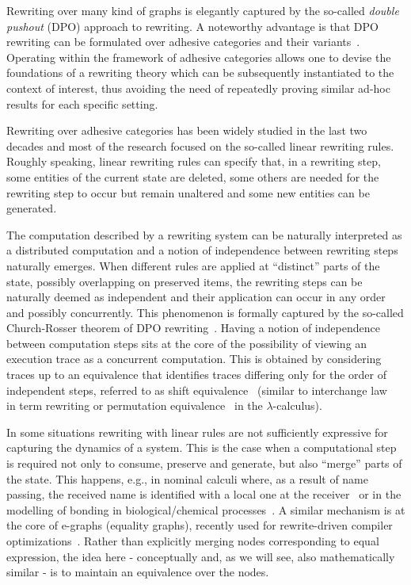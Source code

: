 \documentclass[a4paper,UKenglish,cleveref,pdftex, thm-restate,numberwithinsect]{lipics}
\begin{document}
Rewriting over many kind of graphs is elegantly captured by the
so-called \emph{double pushout} (DPO) approach to rewriting. A
noteworthy advantage is that DPO rewriting can be formulated over
adhesive categories and their
variants~\cite{lack2005adhesive,ehrig2006weak}. Operating within the
framework of adhesive categories allows one to devise the foundations
of a rewriting theory which can be subsequently instantiated to the
context of interest, thus avoiding the need of repeatedly proving
similar ad-hoc results for each specific setting.

Rewriting over adhesive categories has been widely studied in the last
two decades and most of the research focused on the so-called linear
rewriting rules. Roughly speaking, linear rewriting rules can specify
that, in a rewriting step, some entities of the current state are
deleted, some others are needed for the rewriting step to occur but
remain unaltered and some new entities can be generated.

The computation described by a rewriting system can be naturally
interpreted as a distributed computation and a notion of independence
between rewriting steps naturally emerges. When different rules are
applied at ``distinct'' parts of the state, possibly overlapping on
preserved items, the rewriting steps can be naturally deemed as
independent and their application can occur in any order and possibly
concurrently. This phenomenon is formally captured by the so-called
Church-Rosser theorem of DPO rewriting~\cite{CMREHL:AAGT}.
%
Having a notion of independence between computation steps sits at the
core of the possibility of viewing an execution trace as a concurrent
computation. This is obtained by considering traces up to an
equivalence that identifies traces differing only for the order of
independent steps, referred to as shift equivalence~\cite{CMREHL:AAGT}
(similar to interchange law~\cite{Mes92} in term rewriting or
permutation equivalence~\cite{JJL80} in the $\lambda$-calculus).

In some situations rewriting with linear rules are not sufficiently
expressive for capturing the dynamics of a system. This is the case
when a computational step is required not only to consume, preserve
and generate, but also ``merge'' parts of the state. This happens,
e.g., in nominal calculi where, as a result of name passing, the
received name is identified with a local one at the
receiver~\cite{CVY:ESSPE,Gad07} or in the modelling of bonding in
biological/chemical processes~\cite{PUY:MBPE}. A similar mechanism is
at the core of e-graphs (equality graphs), recently used for
rewrite-driven compiler optimizations~\cite{WNW:egg}. Rather than
explicitly merging nodes corresponding to equal expression, the idea
here - conceptually and, as we will see, also mathematically similar -
is to maintain an equivalence
over the nodes.  
\end{document}
